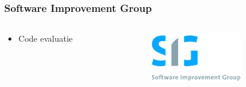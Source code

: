 \begin{frame}\frametitle{Software Improvement Group}
    \begin{columns}[T]
        \begin{column}{.65\textwidth}
            \begin{itemize}
                \item Code evaluatie
            \end{itemize}
        \end{column}
        \begin{column}{.35\textwidth}
            \includegraphics[width=4cm]{images/sig.png}
        \end{column}
    \end{columns}
\end{frame}
